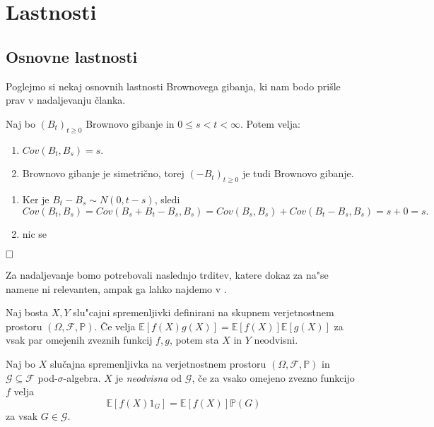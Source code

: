 \documentclass[twoside,11pt]{article}
\begin{document}
\section{Lastnosti}

\subsection{Osnovne lastnosti}

Poglejmo si nekaj osnovnih lastnosti Brownovega gibanja, ki nam bodo prišle prav v nadaljevanju 
članka.

\begin{trditev}
    Naj bo $(B_t)_{t\geq 0}$ Brownovo gibanje in $0 \leq s < t < \infty$. Potem velja:
    \begin{enumerate}
        \item $ Cov(B_t, B_s) = s$.
        \item Brownovo gibanje je simetrično, torej $(-B_{t})_{t\geq0}$ je tudi Brownovo gibanje.	
    \end{enumerate}
\end{trditev}

\begin{dokaz}
    \begin{enumerate}
        \item Ker je $B_t - B_s \sim N(0, t-s)$, sledi
        $$
            Cov(B_t, B_s) = Cov(B_s + B_t - B_s, B_s) = Cov(B_s, B_s) + Cov(B_t - B_s, B_s) = s + 0 = s.
        $$
        \item nic se
    \end{enumerate}
    $\hfill \square$
\end{dokaz}

Za nadaljevanje bomo potrebovali naslednjo trditev, katere dokaz za na"se namene ni relevanten, ampak ga lahko najdemo v \cite{1}.

\begin{trditev}
    Naj bosta $X, Y$ slu"cajni spremenljivki definirani na skupnem verjetnostnem prostoru $(\Omega, \mathcal{F}, \mathbb{P})$.
    Če velja $\mathbb{E}\left[f(X)g(X)\right] = \mathbb{E}\left[f(X)\right]\mathbb{E}\left[g(X)\right]$ za vsak par 
     omejenih zveznih funkcij $f, g$, potem sta $X$ in $Y$ neodvisni.
\end{trditev}

\begin{definicija}
    Naj bo $X$ slučajna spremenljivka na verjetnostnem prostoru $(\Omega, \mathcal{F}, \mathbb{P})$
    in $\mathcal{G} \subseteq \mathcal{F}$ pod-$\sigma$-algebra. $X$ je \textit{neodvisna}
    od $\mathcal{G}$, če za vsako omejeno zvezno funkcijo $f$ velja
    $$
        \mathbb{E}\left[f(X)1_G\right] = \mathbb{E}\left[f(X)\right]\mathbb{P}(G)
    $$
    za vsak $G \in \mathcal{G}$.
\end{definicija}
\end{document}
